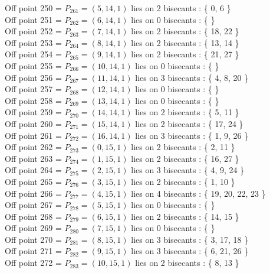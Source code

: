 \documentclass{article}
\begin{document}
{Off point 250 = $P_{261} = ( 5, 14, 1 )$ lies on 2 bisecants : \{ 0, 6 \}\\
Off point 251 = $P_{262} = ( 6, 14, 1 )$ lies on 0 bisecants : \{  \}\\
Off point 252 = $P_{263} = ( 7, 14, 1 )$ lies on 2 bisecants : \{ 18, 22 \}\\
Off point 253 = $P_{264} = ( 8, 14, 1 )$ lies on 2 bisecants : \{ 13, 14 \}\\
Off point 254 = $P_{265} = ( 9, 14, 1 )$ lies on 2 bisecants : \{ 21, 27 \}\\
Off point 255 = $P_{266} = ( 10, 14, 1 )$ lies on 0 bisecants : \{  \}\\
Off point 256 = $P_{267} = ( 11, 14, 1 )$ lies on 3 bisecants : \{ 4, 8, 20 \}\\
Off point 257 = $P_{268} = ( 12, 14, 1 )$ lies on 0 bisecants : \{  \}\\
Off point 258 = $P_{269} = ( 13, 14, 1 )$ lies on 0 bisecants : \{  \}\\
Off point 259 = $P_{270} = ( 14, 14, 1 )$ lies on 2 bisecants : \{ 5, 11 \}\\
Off point 260 = $P_{271} = ( 15, 14, 1 )$ lies on 2 bisecants : \{ 17, 24 \}\\
Off point 261 = $P_{272} = ( 16, 14, 1 )$ lies on 3 bisecants : \{ 1, 9, 26 \}\\
Off point 262 = $P_{273} = ( 0, 15, 1 )$ lies on 2 bisecants : \{ 2, 11 \}\\
Off point 263 = $P_{274} = ( 1, 15, 1 )$ lies on 2 bisecants : \{ 16, 27 \}\\
Off point 264 = $P_{275} = ( 2, 15, 1 )$ lies on 3 bisecants : \{ 4, 9, 24 \}\\
Off point 265 = $P_{276} = ( 3, 15, 1 )$ lies on 2 bisecants : \{ 1, 10 \}\\
Off point 266 = $P_{277} = ( 4, 15, 1 )$ lies on 4 bisecants : \{ 19, 20, 22, 23 \}\\
Off point 267 = $P_{278} = ( 5, 15, 1 )$ lies on 0 bisecants : \{  \}\\
Off point 268 = $P_{279} = ( 6, 15, 1 )$ lies on 2 bisecants : \{ 14, 15 \}\\
Off point 269 = $P_{280} = ( 7, 15, 1 )$ lies on 0 bisecants : \{  \}\\
Off point 270 = $P_{281} = ( 8, 15, 1 )$ lies on 3 bisecants : \{ 3, 17, 18 \}\\
Off point 271 = $P_{282} = ( 9, 15, 1 )$ lies on 3 bisecants : \{ 6, 21, 26 \}\\
Off point 272 = $P_{283} = ( 10, 15, 1 )$ lies on 2 bisecants : \{ 8, 13 \}\\
}
\end{document}
